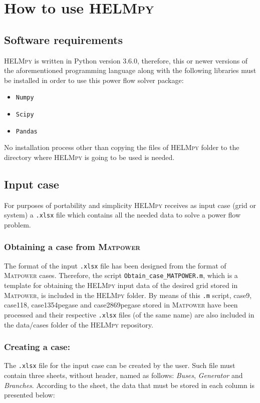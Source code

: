\documentclass[12pt]{article}
\begin{document}
\section{How to use \textsc{HELMpy}}

\subsection{Software requirements}
\textsc{HELMpy} is written in Python version 3.6.0, therefore, this or newer versions of the aforementioned programming language along with the following libraries must be installed in order to use this power flow solver package:
\begin{itemize}
	\item \texttt{Numpy} \cite{numpy}
	\item \texttt{Scipy} \cite{scipy}
	\item \texttt{Pandas} \cite{pandas}
\end{itemize}

No installation process other than copying the files of \textsc{HELMpy} folder to the directory where \textsc{HELMpy} is going to be used is needed.

\subsection{Input case}
For purposes of portability and simplicity \textsc{HELMpy} receives as input case (grid or system) a \texttt{.xlsx} file which contains all the needed data to solve a power flow problem.

\subsubsection{Obtaining a case from \textsc{Matpower}}
The format of the input \texttt{.xlsx} file has been designed from the format of \textsc{Matpower} \cite{matpower} cases. Therefore, the script \texttt{Obtain_case_MATPOWER.m}, which is a template for obtaining the \textsc{HELMpy} input data of the desired grid stored in \textsc{Matpower}, is included in the \textsc{HELMpy} folder. By means of this \texttt{.m} script, case9, case118, case1354pegase and case2869pegase stored in \textsc{Matpower} have been processed and their respective \texttt{.xlsx} files (of the same name) are also included in the data/cases folder of the \textsc{HELMpy} repository.

\subsubsection{Creating a case:}
The \texttt{.xlsx} file for the input case can be created by the user. Such file must contain three sheets, without header, named as follows: \textsl{Buses}, \textsl{Generator} and \textsl{Branches}. According to the sheet, the data that must be stored in each column is presented below: \\
\end{document}
